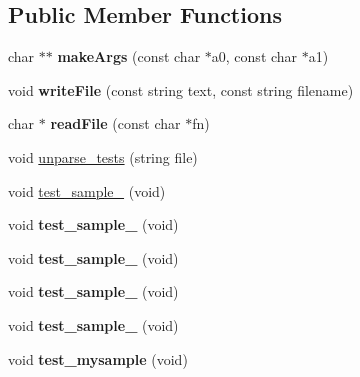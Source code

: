 \subsection*{Public Member Functions}
\begin{DoxyCompactItemize}
\item 
\hypertarget{classScannerTestSuite_a741342209e22b68988214db2c468a556}{char $\ast$$\ast$ {\bfseries make\-Args} (const char $\ast$a0, const char $\ast$a1)}\label{classScannerTestSuite_a741342209e22b68988214db2c468a556}

\item 
\hypertarget{classScannerTestSuite_ad123ba96fb82266232b05190c14ee65f}{void {\bfseries write\-File} (const string text, const string filename)}\label{classScannerTestSuite_ad123ba96fb82266232b05190c14ee65f}

\item 
\hypertarget{classScannerTestSuite_a5633fb2c0b238cf6a9f03ffa4c6f4257}{char $\ast$ {\bfseries read\-File} (const char $\ast$fn)}\label{classScannerTestSuite_a5633fb2c0b238cf6a9f03ffa4c6f4257}

\item 
void \hyperlink{classScannerTestSuite_a7c1f696a90f5d8f22d6af01daffa4077}{unparse\-\_\-tests} (string file)
\item 
void \hyperlink{classScannerTestSuite_a56fe193039ed980337d33d3a75909f1c}{test\-\_\-sample\-\_} (void)
\item 
\hypertarget{classScannerTestSuite_af299e5c4ea94ee35614df27d42afcccc}{void {\bfseries test\-\_\-sample\-\_} (void)}\label{classScannerTestSuite_af299e5c4ea94ee35614df27d42afcccc}

\item 
\hypertarget{classScannerTestSuite_a6c0f8b7252159b524d9598ca0f2e279a}{void {\bfseries test\-\_\-sample\-\_} (void)}\label{classScannerTestSuite_a6c0f8b7252159b524d9598ca0f2e279a}

\item 
\hypertarget{classScannerTestSuite_a7c4fdc8aa307ee47e810091f8502f1e7}{void {\bfseries test\-\_\-sample\-\_} (void)}\label{classScannerTestSuite_a7c4fdc8aa307ee47e810091f8502f1e7}

\item 
\hypertarget{classScannerTestSuite_a4c82ea28f33bef142a5dd8673c1bf416}{void {\bfseries test\-\_\-sample\-\_} (void)}\label{classScannerTestSuite_a4c82ea28f33bef142a5dd8673c1bf416}

\item 
\hypertarget{classScannerTestSuite_ac299f898f944f3051c6e2cb4317b314a}{void {\bfseries test\-\_\-mysample} (void)}\label{classScannerTestSuite_ac299f898f944f3051c6e2cb4317b314a}


\end{DoxyCompactItemize}
